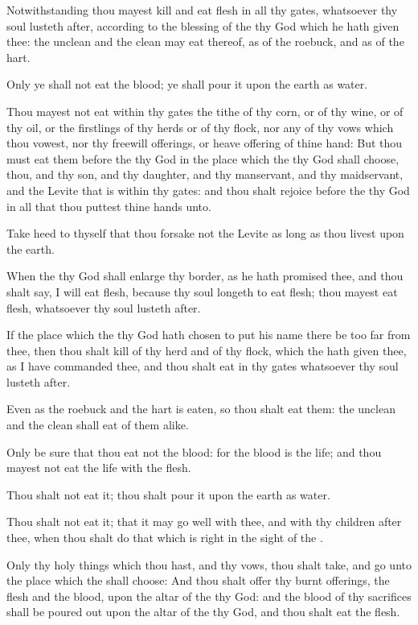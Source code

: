 \Verse Notwithstanding thou mayest kill and eat flesh in all thy gates, whatsoever thy soul lusteth after, according to the blessing of the \LORD thy God which he hath given thee: the unclean and the clean may eat thereof, as of the roebuck, and as of the hart.

\Verse Only ye shall not eat the blood; ye shall pour it upon the earth as water.

\Verse Thou mayest not eat within thy gates the tithe of thy corn, or of thy wine, or of thy oil, or the firstlings of thy herds or of thy flock, nor any of thy vows which thou vowest, nor thy freewill offerings, or heave offering of thine hand: \Verse But thou must eat them before the \LORD thy God in the place which the \LORD thy God shall choose, thou, and thy son, and thy daughter, and thy manservant, and thy maidservant, and the Levite that is within thy gates: and thou shalt rejoice before the \LORD thy God in all that thou puttest thine hands unto.

\Verse Take heed to thyself that thou forsake not the Levite as long as thou livest upon the earth.

\Verse When the \LORD thy God shall enlarge thy border, as he hath promised thee, and thou shalt say, I will eat flesh, because thy soul longeth to eat flesh; thou mayest eat flesh, whatsoever thy soul lusteth after.

\Verse If the place which the \LORD thy God hath chosen to put his name there be too far from thee, then thou shalt kill of thy herd and of thy flock, which the \LORD hath given thee, as I have commanded thee, and thou shalt eat in thy gates whatsoever thy soul lusteth after.

\Verse Even as the roebuck and the hart is eaten, so thou shalt eat them: the unclean and the clean shall eat of them alike.

\Verse Only be sure that thou eat not the blood: for the blood is the life; and thou mayest not eat the life with the flesh.

\Verse Thou shalt not eat it; thou shalt pour it upon the earth as water.

\Verse Thou shalt not eat it; that it may go well with thee, and with thy children after thee, when thou shalt do that which is right in the sight of the \LORD.

\Verse Only thy holy things which thou hast, and thy vows, thou shalt take, and go unto the place which the \LORD shall choose: \Verse And thou shalt offer thy burnt offerings, the flesh and the blood, upon the altar of the \LORD thy God: and the blood of thy sacrifices shall be poured out upon the altar of the \LORD thy God, and thou shalt eat the flesh.

